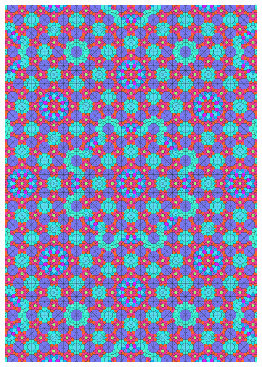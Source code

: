 \documentclass[text.tex]{subfiles}
\begin{document}
\begin{figure}[h!]
\centering
\includegraphics[width=1\textwidth]{img/results/octagon/quasi_polygon-octagon_120710_(0_1alpha_2).pdf}
\end{figure}
\end{document}
